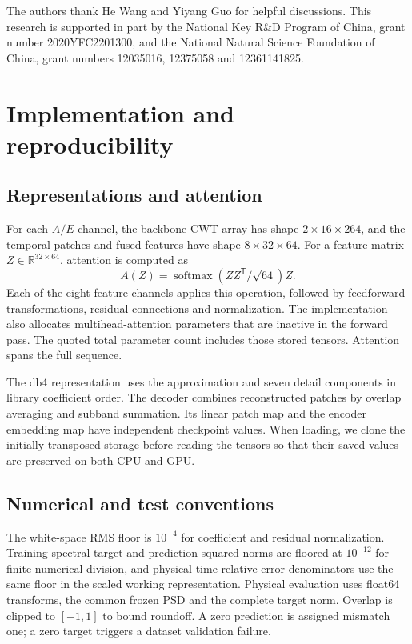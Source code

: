 \documentclass[10pt,prd,aps,a4paper,twocolumn,superscriptaddress,nofootinbib,floatfix]{revtex4-2}
\begin{document}
\begin{acknowledgments}
The authors thank He Wang and Yiyang Guo for helpful discussions. This research is supported in part by the National Key R\&D Program of China, grant number 2020YFC2201300, and the National Natural Science Foundation of China, grant numbers 12035016, 12375058 and 12361141825.

\end{acknowledgments}
\appendix
\section{Implementation and reproducibility}\label{app:model_analysis}
\subsection{Representations and attention}
For each $A/E$ channel, the backbone CWT array has shape $2\times16\times264$, and the temporal patches and fused features have shape $8\times32\times64$. For a feature matrix $Z\in\mathbb R^{32\times64}$, attention is computed as
\begin{equation}
A(Z)=\operatorname{softmax}(ZZ^{\mathsf T}/\sqrt{64})Z.
\end{equation}
Each of the eight feature channels applies this operation, followed by feedforward transformations, residual connections and normalization. The implementation also allocates multihead-attention parameters that are inactive in the forward pass. The quoted total parameter count includes those stored tensors. Attention spans the full sequence.

The db4 representation uses the approximation and seven detail components in library coefficient order. The decoder combines reconstructed patches by overlap averaging and subband summation. Its linear patch map and the encoder embedding map have independent checkpoint values. When loading, we clone the initially transposed storage before reading the tensors so that their saved values are preserved on both CPU and GPU.

\subsection{Numerical and test conventions}
The white-space RMS floor is $10^{-4}$ for coefficient and residual normalization. Training spectral target and prediction squared norms are floored at $10^{-12}$ for finite numerical division, and physical-time relative-error denominators use the same floor in the scaled working representation. Physical evaluation uses float64 transforms, the common frozen PSD and the complete target norm. Overlap is clipped to $[-1,1]$ to bound roundoff. A zero prediction is assigned mismatch one; a zero target triggers a dataset validation failure.
\end{document}
